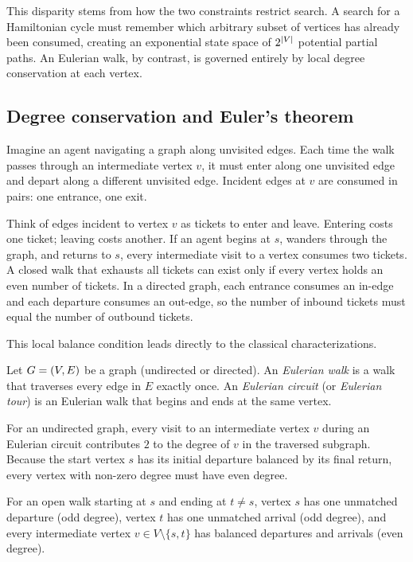 This disparity stems from how the two constraints restrict search. A search for a Hamiltonian cycle must remember which arbitrary subset of vertices has already been consumed, creating an exponential state space of $2^{\lvert V\rvert}$ potential partial paths. An Eulerian walk, by contrast, is governed entirely by local degree conservation at each vertex.

\subsection{Degree conservation and Euler's theorem}

Imagine an agent navigating a graph along unvisited edges. Each time the walk passes through an intermediate vertex $v$, it must enter along one unvisited edge and depart along a different unvisited edge. Incident edges at $v$ are consumed in pairs: one entrance, one exit.

\begin{intuitionbox}
Think of edges incident to vertex $v$ as tickets to enter and leave. Entering costs one ticket; leaving costs another. If an agent begins at $s$, wanders through the graph, and returns to $s$, every intermediate visit to a vertex consumes two tickets. A closed walk that exhausts all tickets can exist only if every vertex holds an even number of tickets. In a directed graph, each entrance consumes an in-edge and each departure consumes an out-edge, so the number of inbound tickets must equal the number of outbound tickets.
\end{intuitionbox}

This local balance condition leads directly to the classical characterizations.

\begin{definition}
\label{ch05:def-eulerian}
Let $G=(V,E)$ be a graph (undirected or directed). An \emph{Eulerian walk} is a walk that traverses every edge in $E$ exactly once. An \emph{Eulerian circuit} (or \emph{Eulerian tour}) is an Eulerian walk that begins and ends at the same vertex.
\end{definition}

For an undirected graph, every visit to an intermediate vertex $v$ during an Eulerian circuit contributes $2$ to the degree of $v$ in the traversed subgraph. Because the start vertex $s$ has its initial departure balanced by its final return, every vertex with non-zero degree must have even degree.

For an open walk starting at $s$ and ending at $t \ne s$, vertex $s$ has one unmatched departure (odd degree), vertex $t$ has one unmatched arrival (odd degree), and every intermediate vertex $v \in V \setminus \{s,t\}$ has balanced departures and arrivals (even degree).

